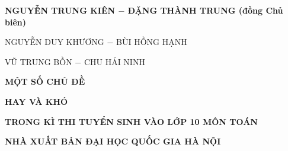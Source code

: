 \begin{titlepage}

\centerline{\bf  NGUYỄN TRUNG KIÊN $-$ ĐẶNG THÀNH TRUNG (đồng Chủ biên)}

\centerline{ NGUYỄN DUY KHƯƠNG $-$ BÙI HỒNG HẠNH}

\centerline{ VŨ TRUNG BỒN $-$ CHU HẢI NINH}




\vspace*{6cm}
\centerline{\bf \Huge MỘT SỐ CHỦ ĐỀ}
\centerline{\bf \LARGE HAY VÀ KHÓ}
\centerline{\bf \large TRONG KÌ THI TUYỂN SINH VÀO LỚP 10 MÔN TOÁN}
\vspace*{0.3cm}

\vfill

\centerline{\bf  NHÀ XUẤT BẢN ĐẠI HỌC QUỐC GIA HÀ NỘI}
\end{titlepage} 



